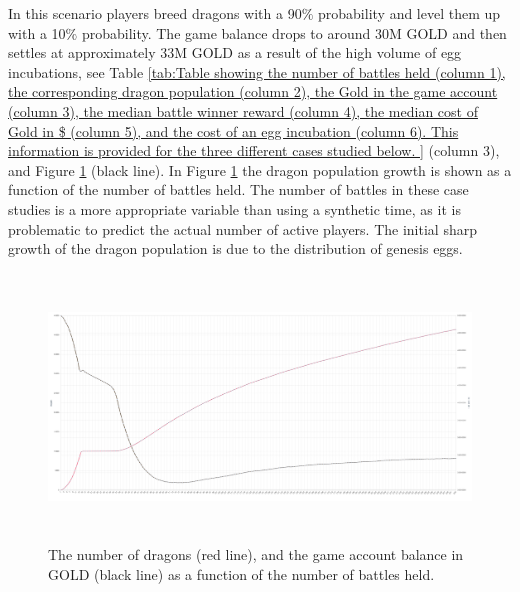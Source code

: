 \documentclass[12pt]{article}
\begin{document}
{%


In this scenario players breed dragons with a 90$\%$  probability and level them up with a 10$\%$  probability. The game balance drops to around 30M GOLD and then settles at approximately 33M GOLD as a result of the high volume of egg incubations, see  Table \ref{tab:Table showing the number of battles held (column 1), the corresponding dragon population (column 2), the Gold in the game account (column 3), the median battle winner reward (column 4), the median cost of Gold in $ (column 5), and the cost of an egg incubation (column 6).  This information is provided for the three different cases studied below. } (column 3), and Figure \ref{fig:The number of dragons (red line) as a function of the number of battles held, and the game account balance in GOLD (black line)} (black line). In Figure \ref{fig:The number of dragons (red line) as a function of the number of battles held, and the game account balance in GOLD (black line)} the dragon population growth is shown as a function of the number of battles held. The number of battles in these case studies is a more appropriate variable than using a synthetic time, as it is problematic to predict the actual number of active players. The initial sharp growth of the dragon population is due to the distribution of genesis eggs.\par




\begin{figure}[H]
	\begin{Center}
		\includegraphics[width=6.27in,height=2.79in]{./media/CS1nimage21.png}
		\caption{The number of dragons (red line), and the game account balance in GOLD (black line)  as a function of the number of battles held.}
		\label{fig:The number of dragons (red line) as a function of the number of battles held, and the game account balance in GOLD (black line)}
	\end{Center}
\end{figure}


}
\end{document}
